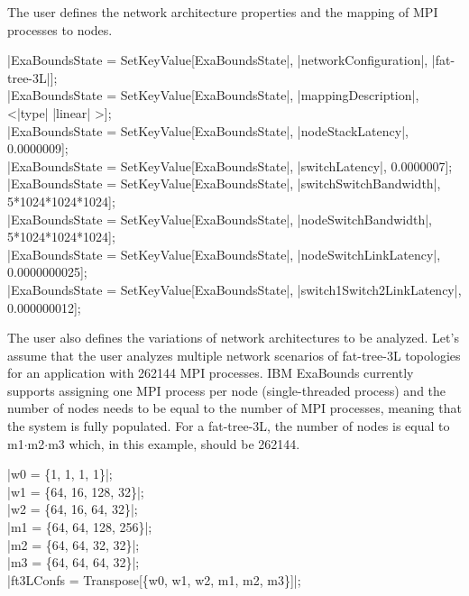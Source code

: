 The user defines the network architecture properties and the mapping of MPI processes to nodes. 
\begin{mma}
	\In |ExaBoundsState = SetKeyValue[ExaBoundsState|, \linebreak {}|networkConfiguration|, |fat-tree-3L|]; \\
	\In	|ExaBoundsState = SetKeyValue[ExaBoundsState|, \linebreak {}|mappingDescription|, <\mid {}|type| \rightarrow {}|linear| \mid>]; \\
	\In	|ExaBoundsState = SetKeyValue[ExaBoundsState|, \linebreak {}|nodeStackLatency|, 0.0000009]; 				\\
	\In	|ExaBoundsState = SetKeyValue[ExaBoundsState|, \linebreak {}|switchLatency|, 0.0000007]; 					\\
	\In	|ExaBoundsState = SetKeyValue[ExaBoundsState|, \linebreak {}|switchSwitchBandwidth|, 5*1024*1024*1024]; 	\\
	\In	|ExaBoundsState = SetKeyValue[ExaBoundsState|, \linebreak {}|nodeSwitchBandwidth|, 5*1024*1024*1024];  	\\
	\In	|ExaBoundsState = SetKeyValue[ExaBoundsState|, \linebreak {}|nodeSwitchLinkLatency|, 0.0000000025];  		\\
	\In	|ExaBoundsState = SetKeyValue[ExaBoundsState|, \linebreak {}|switch1Switch2LinkLatency|, 0.000000012]; \\
\end{mma}

The user also defines the variations of network architectures to be analyzed. Let's assume that the user analyzes multiple network scenarios of fat-tree-3L topologies for an application with 262144 MPI processes. IBM ExaBounds currently supports assigning one MPI process per node (single-threaded process) and the number of nodes needs to be equal to the number of MPI processes, meaning that the system is fully populated. For a fat-tree-3L, the number of nodes is equal to m1$\cdot$m2$\cdot$m3 which, in this example, should be 262144.
\begin{mma}	
	\In |w0 = \{1, 1, 1, 1\}|; 			\\
	\In	|w1 = \{64, 16, 128, 32\}|; 	\\
	\In	|w2 = \{64, 16, 64, 32\}|; 		\\
	\In	|m1 = \{64, 64, 128, 256\}|; 	\\
	\In	|m2 = \{64, 64, 32, 32\}|; 		\\
	\In	|m3 = \{64, 64, 64, 32\}|; 		\\
	\In |ft3LConfs = Transpose[\{w0, w1, w2, m1, m2, m3\}]|; \\
\end{mma}

